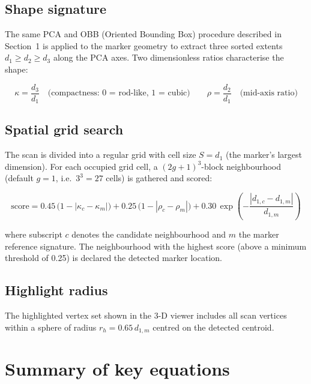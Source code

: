 \documentclass[11pt, a4paper]{article}
\begin{document}
\subsection{Shape signature}

The same PCA and OBB (Oriented Bounding Box) procedure described in
Section~1 is applied to the marker geometry to extract three sorted extents
$d_1 \geq d_2 \geq d_3$ along the PCA axes.  Two dimensionless ratios
characterise the shape:

\begin{equation}
  \kappa = \frac{d_3}{d_1}
  \quad\text{(compactness: 0 = rod-like, 1 = cubic)}
  \qquad
  \rho = \frac{d_2}{d_1}
  \quad\text{(mid-axis ratio)}
\end{equation}

\subsection{Spatial grid search}

The scan is divided into a regular grid with cell size $S = d_1$ (the
marker's largest dimension).  For each occupied grid cell, a
$(2g+1)^3$-block neighbourhood (default $g = 1$, i.e.\ $3^3 = 27$ cells)
is gathered and scored:

\begin{equation}
  \text{score} =
    0.45\,\bigl(1 - |\kappa_c - \kappa_m|\bigr)
  + 0.25\,\bigl(1 - |\rho_c   - \rho_m|\bigr)
  + 0.30\,\exp\!\left(-\frac{|d_{1,c} - d_{1,m}|}{d_{1,m}}\right)
\end{equation}

where subscript $c$ denotes the candidate neighbourhood and $m$ the marker
reference signature.  The neighbourhood with the highest score (above a
minimum threshold of 0.25) is declared the detected marker location.

\subsection{Highlight radius}

The highlighted vertex set shown in the 3-D viewer includes all scan vertices
within a sphere of radius $r_h = 0.65\,d_{1,m}$ centred on the detected
centroid.

\section*{Summary of key equations}
\end{document}
